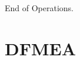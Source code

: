 \documentclass[letter]{article}
\begin{document}
End of Operations.

\section{DFMEA}
%
%
%
%
%
%
%
%
%
%
%
%
%
\end{document}
